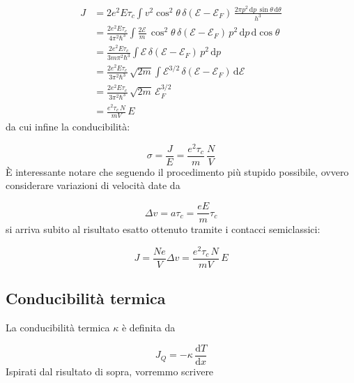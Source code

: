 \documentclass[a4paper]{report}
\begin{document}
\begin{equation}
    \begin{split}
        J & = 2 e^2 E \tau_c \int v^2 \cos^2\theta \,\delta(\mathcal{E}-\mathcal{E}_F) \,\frac{2 \pi p^2 \,\mathrm{d}p \,\sin\theta \,\mathrm{d}\theta}{h^3} \\
        & = \frac{2 e^2 E\tau_c}{4\pi^2 \hbar^3} \int \frac{2\mathcal{E}}{m} \,\cos^2 \theta \, \delta(\mathcal{E}-\mathcal{E}_F) \,p^2\,\mathrm{d}p \,\mathrm{d}\cos\theta \\
        &  = \frac{2 e^2 E \tau_c}{3m\pi^2\hbar^3} \int \mathcal{E}\, \delta(\mathcal{E}-\mathcal{E}_F) \,p^2 \,\mathrm{d}p \\
        & = \frac{2 e^2 E \tau_c}{3\pi^2\hbar^3}\,\sqrt{2m}\int \mathcal{E}^{3/2}\,\delta(\mathcal{E}-\mathcal{E}_F)\,\mathrm{d}\mathcal{E} \\
         & = \frac{2 e^2 E \tau_c}{3\pi^2\hbar^3}\,\sqrt{2m}\, \mathcal{E}_F^{3/2}\\
         & = \frac{e^2 \tau_c \,N}{m V} \,E
    \end{split}
\end{equation}
da cui infine la conducibilità:

\begin{equation}
    \sigma = \frac{J}{E} = \frac{e^2 \tau_c}{m}\,\frac{N}{V}
\end{equation}
È interessante notare che seguendo il procedimento più stupido possibile, ovvero considerare variazioni di velocità date da 

\begin{equation}
    \Delta v = a \tau_c = \frac{e E}{m} \tau_c
\end{equation}
si arriva subito al risultato esatto ottenuto tramite i contacci semiclassici:

\begin{equation}
    J = \frac{N e}{V} \Delta v = \frac{e^2 \tau_c \,N}{m V} \,E
\end{equation}

\subsection{Conducibilità termica}
La conducibilità termica $\kappa$ è definita da

\begin{equation}
    J_Q = - \kappa \,\frac{\mathrm{d}T}{\mathrm{d}x}
\end{equation}
Ispirati dal risultato di sopra, vorremmo scrivere
\end{document}
